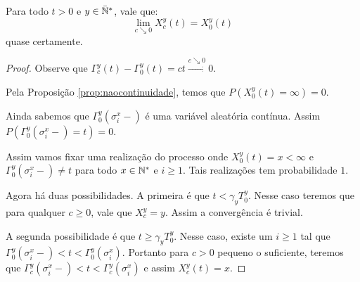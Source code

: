 \begin{lema}
  \label{lema:c_continuo}
  Para todo $t > 0$ e $y \in {\mathbb{\bar{N}^*}}$, vale que:
  \begin{displaymath}
    \lim_{c\searrow 0} X_c^y(t) = X_0^y(t)
  \end{displaymath}
  quase certamente.
\end{lema}
\begin{proof}
  Observe que $\Gamma^y_c (t) - \Gamma^y_0(t) = ct \xrightarrow{c
    \searrow 0} 0$.

  Pela Proposição \ref{prop:naocontinuidade}, temos que $P(X^y_0(t) =
  \infty) = 0$.

  Ainda sabemos que $\Gamma^y_0(\sigma^x_i-)$ é uma variável aleatória
  contínua. Assim $P( \Gamma^y_0(\sigma^x_i-) = t) = 0$.

  Assim vamos fixar uma realização do processo onde
  $X^y_0(t) = x < \infty$ e $\Gamma^y_0(\sigma^x_i-) \neq t$ para todo
  $x \in {\mathbb{N^*}}$ e $i \geq 1$. Tais realizações tem probabilidade $1$.


  Agora há duas possibilidades. A primeira é que $t < \gamma_y
  T^y_0$. Nesse caso teremos que para qualquer $c \geq 0$, vale que
  $X^y_c = y$. Assim a convergência é trivial.

  A segunda possibilidade é que $t \geq \gamma_y T^y_0$. Nesse caso,
  existe um $i \geq 1$ tal que $\Gamma^y_0(\sigma^x_i-) < t <
  \Gamma^y_0(\sigma^x_i)$. Portanto para $c > 0$ pequeno o suficiente,
  teremos que $\Gamma^y_c(\sigma^x_i-) < t < \Gamma^y_c(\sigma^x_i)$ e
  assim $X_c^y(t) = x$.
\end{proof}

